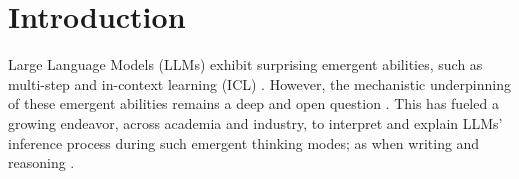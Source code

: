 \documentclass{article}
\begin{document}

\newcommand{\Toni}[1]{{\color{blue}{TL: #1}}}


\section{Introduction}
Large Language Models (LLMs) exhibit surprising emergent abilities, 
such as multi-step \cite{huang-chang-2023-towards} and in-context learning (ICL) \cite{dong-etal-2024-survey,garg2023transformerslearnincontextcase}.
However, the mechanistic underpinning of these emergent abilities remains a deep and open question \cite{olsson2022context,reddy2023mechanisticbasisdatadependence,von2023transformers}. 
This has fueled a growing endeavor, across academia and industry, 
to interpret and explain LLMs' inference process during such emergent thinking modes; 
as when writing \cite{wan2023kellywarmpersonjoseph,guo2024biaslargelanguagemodels} and reasoning \cite{wei2022chain, wang2023understandingchainofthoughtpromptingempirical}. 
\end{document}
